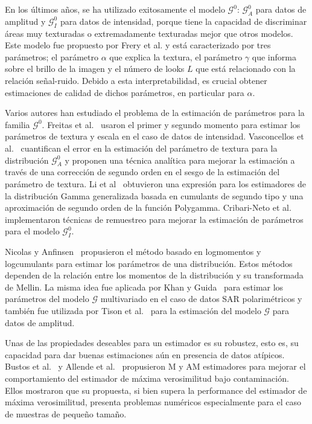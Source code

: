 En los últimos años, se ha utilizado exitosamente el modelo $\mathcal{G}^0$: $\mathcal{G}_A^0$ para datos de amplitud y $\mathcal G_I^0$ para datos de intensidad, porque tiene la capacidad de discriminar áreas muy texturadas o extremadamente texturadas mejor que otros modelos. Este modelo fue propuesto por Frery et al. \cite{Frery97} y está caracterizado por tres parámetros; el parámetro $\alpha$ que explica la textura, el parámetro $\gamma $ que informa sobre el brillo de la imagen y el número de looks $L$ que está relacionado con la relación señal-ruido.
Debido a esta interpretabilidad, es crucial obtener estimaciones de calidad de dichos parámetros, en particular para $\alpha$.

Varios autores han estudiado el problema de la estimación de parámetros para la familia $\mathcal G^0$. Freitas et al.~\cite{Freitas2005} usaron el primer y segundo momento para estimar los parámetros de textura y escala en el caso de datos de intensidad.
Vasconcellos et al.~\cite{VasconcellosFrerySilva:CompStat} cuantifican el error en la estimación del parámetro de textura para la distribución $\mathcal G_A^0$ y proponen una técnica analítica para mejorar la estimación a través de una corrección de segundo orden en el sesgo de la estimación del parámetro de textura. Li et al~\cite{Li2011} obtuvieron una expresión para los estimadores de la distribución Gamma generalizada basada en cumulants de segundo tipo y una aproximación de segundo orden de la función Polygamma. Cribari-Neto et al.~\cite{CribariFrerySilva:CSDA} implementaron técnicas de remuestreo para mejorar la estimación de parámetros para el modelo $\mathcal G_I^0$.

Nicolas y Anfinsen~\cite{nicolas2002} propusieron el método basado en logmomentos y logcumulants para estimar los parámetros de una distribución. Estos métodos dependen de la relación entre los momentos de la distribución y su transformada de Mellin. La misma idea fue aplicada por Khan y Guida~\cite{khan2014} para estimar los parámetros del modelo $\mathcal{G}$ multivariado en el caso de datos SAR polarimétricos y también fue utilizada por Tison et al.~\cite{Tison2004} para la estimación del modelo $\mathcal{G}$ para datos de amplitud.

Unas de las propiedades deseables para un estimador es su robustez, esto es, su capacidad para dar buenas estimaciones aún en presencia de datos atípicos. Bustos et al.~\cite{BustosFreryLucini:Mestimators:2001} y Allende et al.~\cite{AllendeFreryetal:JSCS:05} propusieron M y AM estimadores para mejorar el comportamiento del estimador de máxima verosimilitud bajo contaminación. Ellos mostraron que su propuesta, si bien supera la performance del estimador de máxima verosimilitud, presenta problemas numéricos especialmente para el caso de muestras de pequeño tamaño.

